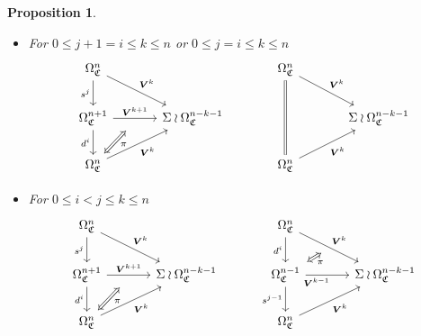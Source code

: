 \documentclass[a4paper,10pt
,draft
]{article}%
\numberwithin{equation}{section}
\numberwithin{figure}{section}
\newtheorem{proposition}[equation]{Proposition}%
\theoremstyle{definition} %
\newcommand{\1}{\ensuremath{\mathbbm 1}}%
\begin{document}
\begin{proposition}
\begin{itemize}
\item[(DF2)]
For $0 \leq j+1 = i \leq k \leq n$ or 
$0 \leq j = i \leq k \leq n$
\begin{equation}
\begin{tikzcd}[row sep = 20pt, column sep = 35pt]
	\Omega^n_{\mathfrak{C}}
	\arrow{dr}[swap,name=U]{}{\boldsymbol{V}^k} \arrow{d}[swap]{s^j} &
&
	\Omega^n_{\mathfrak{C}}
	\arrow{dr}[swap,name=UUU]{}{\boldsymbol{V}^k} \arrow[equal]{dd} &
\\
	|[alias=V]|
	\Omega^{n+1}_{\mathfrak{C}} \ar{r}{\boldsymbol{V}^{k+1}}[swap,name=UU]{} \arrow{d}[swap]{d^i}&
	\Sigma \wr \Omega^{n-k-1}_{\mathfrak{C}}
&
	&
	\Sigma \wr \Omega^{n-k-1}_{\mathfrak{C}}
\\
	|[alias=VV]|
	\Omega^{n}_{\mathfrak{C}} \arrow{ur}[swap]{\boldsymbol{V}^k} &
&
	|[alias=VVVV]|
	\Omega^{n}_{\mathfrak{C}} \arrow{ur}[swap]{\boldsymbol{V}^k} &
\arrow[Leftrightarrow, from=VV, to=UU,shorten >=0.25cm,shorten <=0.05cm
,swap,"\pi"
]
\end{tikzcd}
\end{equation}

\item[(DF3)]
For $0\leq i < j \leq k \leq n$
\begin{equation}
\begin{tikzcd}[row sep = 20pt, column sep = 35pt]
	\Omega^n_{\mathfrak{C}}
	\arrow{dr}[swap,name=U]{}{\boldsymbol{V}^k} \arrow{d}[swap]{s^j} &
&
	\Omega^n_{\mathfrak{C}}
	\arrow{dr}[swap,name=UUU]{}{\boldsymbol{V}^k} \arrow{d}[swap]{d^{i}} &
\\
	|[alias=V]|
	\Omega^{n+1}_{\mathfrak{C}} \ar{r}{\boldsymbol{V}^{k+1}}[swap,name=UU]{} \arrow{d}[swap]{d^i}&
	\Sigma \wr \Omega^{n-k-1}_{\mathfrak{C}}
&
	|[alias=VVV]|
	\Omega^{n-1}_{\mathfrak{C}} \ar{r}[near start, swap]{\boldsymbol{V}^{k-1}}[swap,name=UUUU]{} \ar{d}[swap]{s^{j-1}} &
	\Sigma \wr \Omega^{n-k-1}_{\mathfrak{C}}
\\
	|[alias=VV]|
	\Omega^{n}_{\mathfrak{C}} \arrow{ur}[swap]{\boldsymbol{V}^k} &
&
	|[alias=VVVV]|
	\Omega^{n}_{\mathfrak{C}} \arrow{ur}[swap]{\boldsymbol{V}^k} &
\arrow[Leftrightarrow, from=VV, to=UU,shorten >=0.25cm,shorten <=0.05cm
,swap,"\pi"
]
\arrow[Leftrightarrow, from=VVV, to=UUU,shorten >=0.05cm,shorten <=0.05cm
,swap,"\pi"
]
\end{tikzcd}
\end{equation}


\end{itemize}
\end{proposition}
\end{document}
